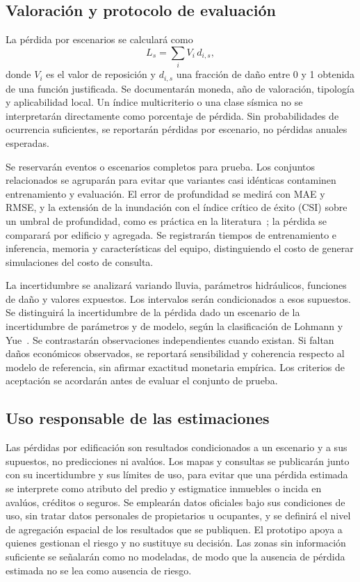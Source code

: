 \documentclass[journal]{IEEEtran}
\begin{document}
\subsection{Valoración y protocolo de evaluación}

La pérdida por escenarios se calculará como
\begin{equation}
L_s = \sum_i V_i \, d_{i,s},
\label{eq:perdida}
\end{equation}
donde $V_i$ es el valor de reposición y $d_{i,s}$ una fracción de daño entre 0 y 1 obtenida de una función justificada. Se documentarán moneda, año de valoración, tipología y aplicabilidad local. Un índice multicriterio o una clase sísmica no se interpretarán directamente como porcentaje de pérdida. Sin probabilidades de ocurrencia suficientes, se reportarán pérdidas por escenario, no pérdidas anuales esperadas.

Se reservarán eventos o escenarios completos para prueba. Los conjuntos relacionados se agruparán para evitar que variantes casi idénticas contaminen entrenamiento y evaluación. El error de profundidad se medirá con MAE y RMSE, y la extensión de la inundación con el índice crítico de éxito (CSI) sobre un umbral de profundidad, como es práctica en la literatura~\cite{bentivoglio2022,seleem2023,cache2024}; la pérdida se comparará por edificio y agregada. Se registrarán tiempos de entrenamiento e inferencia, memoria y características del equipo, distinguiendo el costo de generar simulaciones del costo de consulta.

La incertidumbre se analizará variando lluvia, parámetros hidráulicos, funciones de daño y valores expuestos. Los intervalos serán condicionados a esos supuestos. Se distinguirá la incertidumbre de la pérdida dado un escenario de la incertidumbre de parámetros y de modelo, según la clasificación de Lohmann y Yue~\cite{lohmann2011}. Se contrastarán observaciones independientes cuando existan. Si faltan daños económicos observados, se reportará sensibilidad y coherencia respecto al modelo de referencia, sin afirmar exactitud monetaria empírica. Los criterios de aceptación se acordarán antes de evaluar el conjunto de prueba.

\subsection{Uso responsable de las estimaciones}

Las pérdidas por edificación son resultados condicionados a un escenario y a sus supuestos, no predicciones ni avalúos. Los mapas y consultas se publicarán junto con su incertidumbre y sus límites de uso, para evitar que una pérdida estimada se interprete como atributo del predio y estigmatice inmuebles o incida en avalúos, créditos o seguros. Se emplearán datos oficiales bajo sus condiciones de uso, sin tratar datos personales de propietarios u ocupantes, y se definirá el nivel de agregación espacial de los resultados que se publiquen. El prototipo apoya a quienes gestionan el riesgo y no sustituye su decisión. Las zonas sin información suficiente se señalarán como no modeladas, de modo que la ausencia de pérdida estimada no se lea como ausencia de riesgo.
\end{document}
